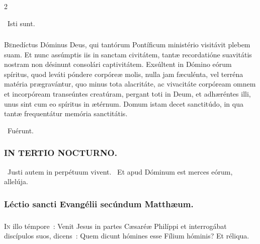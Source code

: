 \documentclass[9pt,twoside]{extarticle}
\begin{document}
\begin{multicols}{2}
{{\begin{tightlist}{}
~Isti sunt.
\end{tightlist}

\subsubsection*{\center {}}
\lettrine{B}enedíctus Dóminus Deus, qui tantórum Pontíficum ministério visitávit plebem suam. Et nunc assúmptis iis in sanctam civitátem, tantæ recordatióne suavitátis nostram non désinunt consolári captivitátem. Exsúltent in Dómino eórum spíritus, quod leváti póndere corpóreæ molis, nulla jam fæculénta, vel terréna matéria prægravántur, quo minus tota alacritáte, ac vivacitáte corpóream omnem et incorpóream transeúntes creatúram, pergant toti in Deum, et adhæréntes illi, unus sint cum eo spíritus in ætérnum. Domum istam decet sanctitúdo, in qua tantæ frequentátur memória sanctitátis.

\begin{tightlist}{}
\item {}~Fuérunt.
\end{tightlist}

\subsubsection*{\center \textsc{IN TERTIO NOCTURNO.}}
\begin{tightlist}{}
\item {}~Justi autem in perpétuum vivent. ~Et apud Dóminum est merces eórum, allelúja.
\end{tightlist}

\subsubsection*{\center Léctio sancti Evangélii secúndum Matthæum.}
\subsubsection*{\center {}}
\lettrine{I}n illo témpore~: Venit Jesus in partes Cæsaréæ Philíppi et interrogábat discípulos suos, dicens~: Quem dicunt hómines esse Fílium hóminis? Et réliqua.

}}
\end{multicols}
\end{document}
